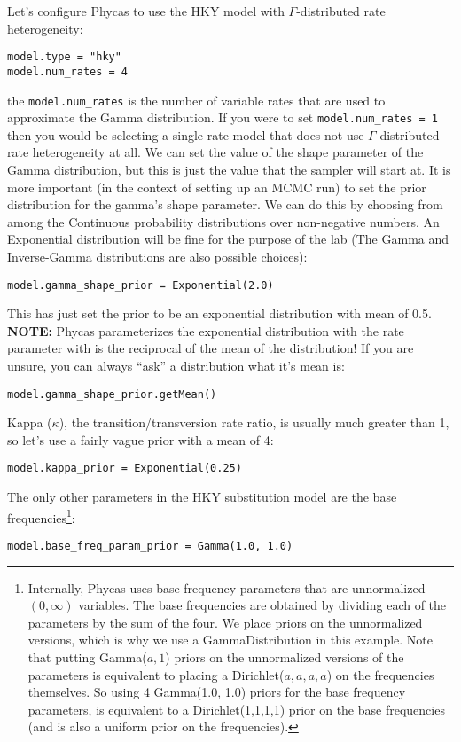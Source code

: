 \documentclass{article}
\newcommand{\cmd}[1]{\texttt{#1}\xspace}
\newcommand{\phycas}{Phycas\xspace}
\begin{document}
Let's configure \phycas to use the HKY model with $\Gamma$-distributed rate heterogeneity:

\begin{verbatim}
model.type = "hky"
model.num_rates = 4
\end{verbatim}
the \cmd{model.num\_rates} is the number of variable rates that are used to approximate the Gamma distribution. 
If you were to set \cmd{model.num\_rates = 1} then you would be selecting a single-rate model that does not use $\Gamma$-distributed rate heterogeneity at all.
We can set the value of the shape parameter of the Gamma distribution, but this is just the value that the sampler will start at.  
It is more important (in the context of setting up an MCMC run) to set the prior distribution for the gamma's shape parameter.
We can do this by choosing from among the Continuous probability distributions over non-negative numbers.
An Exponential distribution will be fine for the purpose of the lab (The Gamma and Inverse-Gamma distributions are also possible choices):
\begin{verbatim}
model.gamma_shape_prior = Exponential(2.0)
\end{verbatim}
This has just set the prior to be an exponential distribution with mean of 0.5.
\\{\bf NOTE:}  \phycas parameterizes the exponential distribution with the rate parameter with is the reciprocal of the mean of the distribution!
If you are unsure, you can always ``ask'' a distribution what it's mean is:
\begin{verbatim}
model.gamma_shape_prior.getMean()
\end{verbatim}


Kappa ($\kappa$), the transition/transversion rate ratio, is usually much greater than 1, so let's use a fairly vague prior with a mean of 4:
\begin{verbatim}
model.kappa_prior = Exponential(0.25)
\end{verbatim}

The only other parameters in the HKY substitution model are the base frequencies\footnote{
Internally, \phycas uses base frequency parameters that are unnormalized $(0,\infty)$ variables.
The base frequencies are obtained by dividing each of the parameters by the sum of the four.
We place priors on the unnormalized versions, which is why we use a GammaDistribution in this example.
Note that putting Gamma($a,1$) priors on the unnormalized versions of the parameters is 
equivalent to placing a Dirichlet($a,a,a,a$) on the frequencies themselves.
So using 4 Gamma(1.0, 1.0) priors for the base frequency parameters, is equivalent to a Dirichlet(1,1,1,1)
prior on the base frequencies (and is also a uniform prior on the frequencies).
}:
\begin{verbatim}
model.base_freq_param_prior = Gamma(1.0, 1.0)
\end{verbatim}
\end{document}
